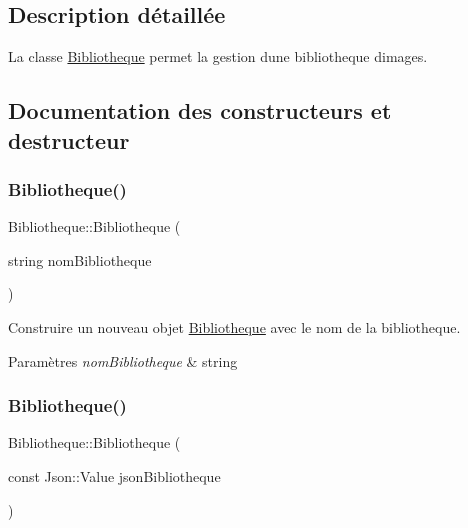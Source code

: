 \subsection{Description détaillée}
La classe \hyperlink{classBibliotheque}{Bibliotheque} permet la gestion d\textquotesingle{}une bibliotheque d\textquotesingle{}images. 

\subsection{Documentation des constructeurs et destructeur}
\mbox{\label{classBibliotheque_ac18f721f99ed6699547099e554af08fe}} 
\subsubsection{\texorpdfstring{Bibliotheque()}{Bibliotheque()}\hspace{0.1cm}{\footnotesize\ttfamily [1/2]}}
{\footnotesize\ttfamily Bibliotheque\+::\+Bibliotheque (\begin{DoxyParamCaption}\item[{string}]{nom\+Bibliotheque }\end{DoxyParamCaption})}



Construire un nouveau objet \hyperlink{classBibliotheque}{Bibliotheque} avec le nom de la bibliotheque. 


\begin{DoxyParams}{Paramètres}
{\em nom\+Bibliotheque} & string \\
\hline
\end{DoxyParams}
\mbox{\label{classBibliotheque_abeef5fed51f37a993d77ba5af478051c}} 
\subsubsection{\texorpdfstring{Bibliotheque()}{Bibliotheque()}\hspace{0.1cm}{\footnotesize\ttfamily [2/2]}}
{\footnotesize\ttfamily Bibliotheque\+::\+Bibliotheque (\begin{DoxyParamCaption}\item[{const Json\+::\+Value}]{json\+Bibliotheque }\end{DoxyParamCaption})}



